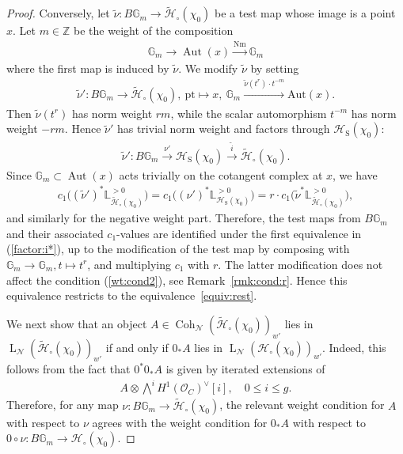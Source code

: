 \documentclass[11pt,oneside,a4paper,mathscr]{amsart}
\theoremstyle{definition}
\renewcommand{\leq}{\leqslant}
\newcommand{\LL}{\operatorname{L}}
\newcommand{\cH}{\mathcal{H}}
\newcommand{\bgm}{B\mathbb{G}_m}
\newcommand{\Coh}{\operatorname{Coh}}
\newcommand{\Aut}{\operatorname{Aut}}
\newcommand{\rS}{\mathrm{S}}
\begin{document}
\begin{proof}
Conversely, let 
$\widetilde{\nu} \colon \bgm \to \widetilde{\cH}_{\circ}(\chi_0)$ 
be a test map whose image is a point $x$. Let $m\in \mathbb{Z}$ be the weight 
of the composition
\begin{align*}
\mathbb{G}_m \to \Aut(x) 
\stackrel{\mathrm{Nm}}{\to} 
\mathbb{G}_m
\end{align*}
where the first map is induced by $\widetilde{\nu}$. 
We modify $\widetilde{\nu}$ by setting 
\begin{align*}
  \widetilde{\nu}' \colon \bgm \to \widetilde{\cH}_{\circ}(\chi_0), \ 
  \mathrm{pt} \mapsto x, \ \mathbb{G}_m \stackrel{\widetilde{\nu}(t^r)\cdot t^{-m}}{\to}\mathrm{Aut}(x).
\end{align*}
Then $\widetilde\nu(t^r)$ has norm weight $rm$, while the scalar automorphism
$t^{-m}$ has norm weight $-rm$. Hence
$\widetilde\nu'$ has trivial norm weight and factors through
$\cH_{\rS}(\chi_0)$:
\begin{align*}
\widetilde{\nu}' \colon 
  \bgm \stackrel{\nu'}{\to} \cH_{\rS}(\chi_0) 
  \stackrel{\widetilde{i}}{\to} 
  \widetilde{\cH}_{\circ}(\chi_0).
\end{align*}
Since 
$\mathbb{G}_m \subset \Aut(x)$ acts trivially on the cotangent complex at $x$, 
we have 
\begin{align*}
c_1\bigl(
(\widetilde{\nu}')^* 
\mathbb{L}^{>0}_{\widetilde{\cH}_{\circ}(\chi_0)}
\bigr) 
=
c_1\bigl(
(\nu')^* 
\mathbb{L}_{\cH_{\rS}(\chi_0)}^{>0}
\bigr)=r\cdot c_1\bigl(
\widetilde{\nu}^{*}
\mathbb{L}^{>0}_{\widetilde{\cH}_{\circ}(\chi_0)}
\bigr),
\end{align*}
and similarly for the negative weight part. 
Therefore, the test maps from $\bgm$ and their associated $c_1$-values are 
identified under the first equivalence in (\ref{factor:i*}), up to the modification of the test 
map by composing with $\mathbb{G}_m \to \mathbb{G}_m, t\mapsto t^r$, and multiplying $c_1$ with $r$. 
The latter modification does not affect the condition (\ref{wt:cond2}), see Remark~\ref{rmk:cond:r}. 
Hence this equivalence restricts 
to the equivalence~\eqref{equiv:rest}.

We next show that an object 
$A\in \Coh_{\mathcal{N}}(\widetilde{\cH}_{\circ}(\chi_0))_{w'}$ lies in 
$\LL_{\mathcal{N}}(\widetilde{\cH}_{\circ}(\chi_0))_{w'}$ if and only if 
$0_{*}A$ lies in $\LL_{\mathcal{N}}(\cH_{\circ}(\chi_0))_{w'}$. 
Indeed, this follows from the fact that $0^*0_{*}A$
is given by iterated extensions of 
\begin{align*}
    A \otimes \bigwedge^i H^1(\mathcal{O}_C)^{\vee}[i],
    \quad 0\leq i\leq g.
\end{align*}
Therefore, for any map 
$\nu \colon \bgm \to \widetilde{\cH}_{\circ}(\chi_0)$, 
the relevant weight condition for $A$ with respect to $\nu$ agrees with 
the weight condition for $0_{*}A$ with respect to 
$0\circ \nu \colon \bgm \to \cH_{\circ}(\chi_0)$.


\end{proof}
\end{document}
